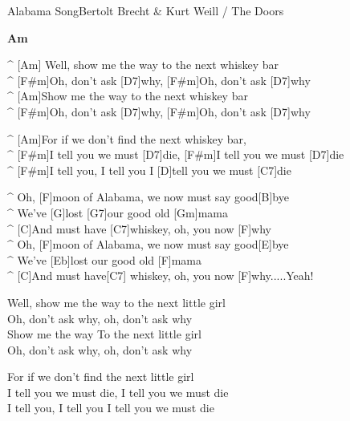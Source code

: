 \begin{song}{Alabama Song}{Bertolt Brecht \& Kurt Weill / The Doors}

 \textbf{Am}

\begin{guitar}
^ [Am]   Well, show me the way to the next whiskey bar \\
^ [F#m]Oh, don't ask [D7]why, [F#m]Oh, don't ask [D7]why\\
^ [Am]Show me the way to the next whiskey bar\\
^ [F#m]Oh, don't ask [D7]why, [F#m]Oh, don't ask [D7]why\\
\end{guitar}

\begin{guitar}
^ [Am]For if we don't find the next whiskey bar,\\
^ [F#m]I tell you we must [D7]die, [F#m]I tell you we must [D7]die\\
^ [F#m]I tell you, I tell you I [D]tell you we must [C7]die \\
\end{guitar}

\begin{guitar}
^ Oh, [F]moon of Alabama, we now must say good[B]bye \\
^ We've [G]lost [G7]our good old [Gm]mama\\
^ [C]And must have [C7]whiskey, oh, you now [F]why\\
^ Oh, [F]moon of Alabama, we now must say good[E]bye\\
^ We've [Eb]lost our good old [F]mama  \\
^ [C]And must have[C7] whiskey, oh, you now [F]why.....Yeah!\\
\end{guitar}

\begin{guitar}
Well, show me the way to the next little girl \\
Oh, don't ask why, oh, don't ask why\\
Show me the way To the next little girl \\
Oh, don't ask why, oh, don't ask why\\
\end{guitar}

\begin{guitar}
For if we don't find the next little girl \\
I tell you we must die, I tell you we must die \\
I tell you, I tell you I tell you we must die \\
\end{guitar}

\end{song}
